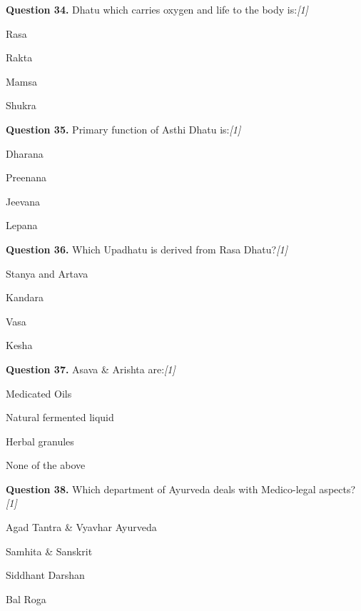 \documentclass[11pt,a4paper]{article}
\newcommand{\pts}[1]{\hfill   \textit{[#1]}}
\begin{document}
\medskip


\noindent   \textbf{Question 34.} Dhatu which carries oxygen and life to the body is:\pts{1}

\begin{parts}
  \item Rasa
  \item Rakta
  \item Mamsa
  \item Shukra
\end{parts}

\medskip


\noindent   \textbf{Question 35.} Primary function of Asthi Dhatu is:\pts{1}

\begin{parts}
  \item Dharana
  \item Preenana
  \item Jeevana
  \item Lepana
\end{parts}

\medskip


\noindent   \textbf{Question 36.} Which Upadhatu is derived from Rasa Dhatu?\pts{1}

\begin{parts}
  \item Stanya and Artava
  \item Kandara
  \item Vasa
  \item Kesha
\end{parts}

\medskip


\noindent   \textbf{Question 37.} Asava & Arishta are:\pts{1}

\begin{parts}
  \item Medicated Oils
  \item Natural fermented liquid
  \item Herbal granules
  \item None of the above
\end{parts}

\medskip


\noindent   \textbf{Question 38.} Which department of Ayurveda deals with Medico-legal aspects?\pts{1}

\begin{parts}
  \item Agad Tantra & Vyavhar Ayurveda
  \item Samhita & Sanskrit
  \item Siddhant Darshan
  \item Bal Roga
\end{parts}
\end{document}

